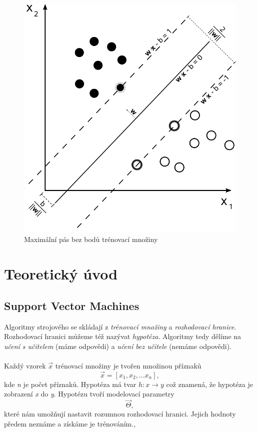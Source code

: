 \documentclass[a4]{article}
\begin{document}
\begin{figure}[!ht]
	\centering
		\includegraphics[scale=0.25]{images/svm_vectors}
	\caption{Maximální pás bez bodů trénovací množiny \cite{svm_wiki}}
	\label{fig:svm_vectors}
\end{figure}

\section{Teoretický úvod}

\subsection{Support Vector Machines}
Algoritmy strojového se skládají z \textit{trénovací množiny} a \textit{rozhodovací hranice}. Rozhodovací hranici můžeme též nazývat \textit{hypotéza}. Algoritmy tedy dělíme na \textit{učení s učitelem} (máme odpovědi) a \textit{učení bez učitele} (nemáme odpovědi).
\\\\
Každý vzorek $\vec{x}$ trénovací množiny je tvořen množinou příznaků $$\vec{x} = [x_1,x_2,...x_n],$$kde \textit{n} je počet příznaků. Hypotéza má tvar $h:x \rightarrow y$ což znamená, že hypotéza je zobrazení \textit{x} do \textit{y}. Hypotézu tvoří modelovací parametry $$\vec{\Theta},$$které nám umožňují nastavit rozumnou rozhodovací hranici. Jejich hodnoty předem neznáme a získáme je trénováním.\cite{andrew},\cite{svm_zcu}
\end{document}
